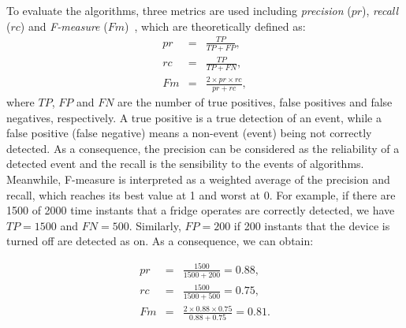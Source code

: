 To evaluate the algorithms, three metrics are used including \textit{precision} ($pr$), \textit{recall} ($rc$) and \textit{F-measure} ($Fm$)~\cite{Olson2008}, which are theoretically defined as:
\begin{eqnarray}\label{eva-metrics}
pr &=& \frac{TP}{TP+FP},\\
rc &=& \frac{TP}{TP+FN},\\
Fm &=& \frac{2\times pr \times rc}{pr+rc},
\end{eqnarray}
where $TP$, $FP$ and $FN$ are the number of true positives, false positives and false negatives, respectively. A true positive is a true detection of an event, while a false positive (false negative) means a non-event (event) being not correctly detected. As a consequence, the precision can be considered as the reliability of a detected event and the recall is the sensibility to the events of algorithms. Meanwhile, F-measure is interpreted as a weighted average of the precision and recall, which reaches its best value at 1 and worst at 0. For example, if there are 1500 of 2000 time instants that a fridge operates are correctly detected, we have $TP=1500$ and $FN=500$. Similarly, $FP = 200$ if 200 instants that the device is turned off are detected as on. As a consequence, we can obtain:

\begin{eqnarray*}
pr &=& \frac{1500}{1500+200} = 0.88,\\
rc &=& \frac{1500}{1500+500} = 0.75,\\
Fm &=& \frac{2\times 0.88 \times 0.75}{0.88+0.75} = 0.81.
\end{eqnarray*}


